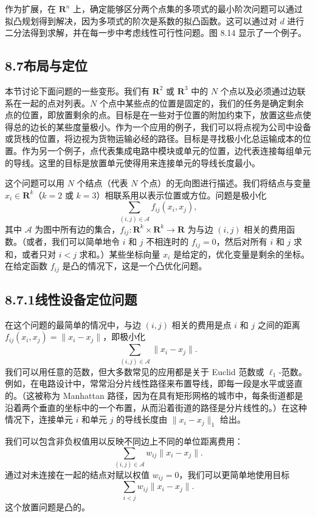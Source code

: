 \documentclass[UTF8,12pt,a4paper,fontset=fandol]{ctexart}
\begin{document}
作为扩展，在 $\mathbf{R}^n$ 上，确定能够区分两个点集的多项式的最小阶次问题可以通过拟凸规划得到解决，因为多项式的阶次是系数的拟凸函数。这可以通过对 $d$ 进行二分法得到求解，并在每一步中考虑线性可行性问题。图 8.14 显示了一个例子。

\subsection*{8.7\quad 布局与定位}

本节讨论下面问题的一些变形。我们有 $\mathbf{R}^2$ 或 $\mathbf{R}^3$ 中的 $N$ 个点以及必须通过边联系在一起的点对列表。$N$ 个点中某些点的位置是固定的，我们的任务是确定剩余点的位置，即放置剩余的点。目标是在一些对于位置的附加约束下，放置这些点使得总的边长的某些度量极小。作为一个应用的例子，我们可以将点视为公司中设备或货栈的位置，将边视为货物运输必经的路径。目标是寻找极小化总运输成本的位置。作为另一个例子，点代表集成电路中模块或单元的位置，边代表连接每组单元的导线。这里的目标是放置单元使得用来连接单元的导线长度最小。

这个问题可以用 $N$ 个结点（代表 $N$ 个点）的无向图进行描述。我们将结点与变量 $x_i\in\mathbf{R}^k$（$k=2$ 或 $k=3$）相联系用以表示位置或方位。问题是极小化
\[
\sum_{(i,j)\in\mathcal A} f_{ij}(x_i,x_j),
\]
其中 $\mathcal A$ 为图中所有边的集合，$f_{ij}:\mathbf{R}^k\times\mathbf{R}^k\to\mathbf{R}$ 为与边 $(i,j)$ 相关的费用函数。（或者，我们可以简单地令 $i$ 和 $j$ 不相连时的 $f_{ij}=0$，然后对所有 $i$ 和 $j$ 求和，或者只对 $i<j$ 求和。）某些坐标向量 $x_i$ 是给定的，优化变量是剩余的坐标。在给定函数 $f_{ij}$ 是凸的情况下，这是一个凸优化问题。

\subsection*{8.7.1\quad 线性设备定位问题}

在这个问题的最简单的情况中，与边 $(i,j)$ 相关的费用是点 $i$ 和 $j$ 之间的距离 $f_{ij}(x_i,x_j)=\|x_i-x_j\|$，即极小化
\[
\sum_{(i,j)\in\mathcal A}\|x_i-x_j\|.
\]
我们可以用任意的范数，但大多数常见的应用都是关于 Euclid 范数或 $\ell_1$-范数。例如，在电路设计中，常常沿分片线性路径来布置导线，即每一段是水平或竖直的。（这被称为 Manhattan 路径，因为在具有矩形网格的城市中，每条街道都是沿着两个垂直的坐标中的一个布置，从而沿着街道的路径是分片线性的。）在这种情况下，连接单元 $i$ 和单元 $j$ 的导线长度由 $\|x_i-x_j\|_1$ 给出。

我们可以包含非负权值用以反映不同边上不同的单位距离费用：
\[
\sum_{(i,j)\in\mathcal A} w_{ij}\|x_i-x_j\|.
\]
通过对未连接在一起的结点对赋以权值 $w_{ij}=0$，我们可以更简单地使用目标
\[
\sum_{i<j} w_{ij}\|x_i-x_j\|.
\tag{8.28}
\]
这个放置问题是凸的。
\end{document}
